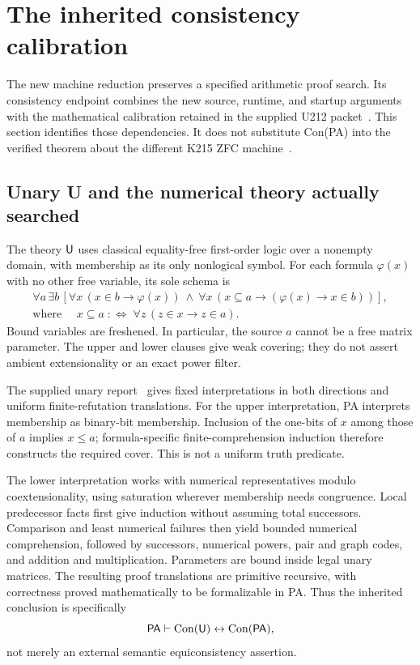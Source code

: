 \section{The inherited consistency calibration}
\label{sec:calibration}

The new machine reduction preserves a specified arithmetic proof search.
Its consistency endpoint combines the new source, runtime, and startup
arguments with the mathematical calibration retained in the supplied U212
packet~\cite{combined}. This section identifies those dependencies. It does
not substitute Con(PA) into the verified theorem about the different K215
ZFC machine~\cite{k215pa}.

\subsection{Unary U and the numerical theory actually searched}

The theory $\mathsf U$ uses classical equality-free first-order logic over a
nonempty domain, with membership as its only nonlogical symbol. For each
formula $\varphi(x)$ with no other free variable, its sole schema is
\[
 \begin{gathered}
 \forall a\,\exists b\,
 \left[
   \forall x\,(x\in b\to\varphi(x))\ \land\
   \forall x\,(x\subseteq a\to(\varphi(x)\to x\in b))
 \right],\\[4pt]
 \text{where }\quad
 x\subseteq a\;:\!\Longleftrightarrow\;
     \forall z\,(z\in x\to z\in a).
 \end{gathered}
\]
Bound variables are freshened. In particular, the source $a$ cannot be
a free matrix parameter. The upper and lower clauses give weak covering;
they do not assert ambient extensionality or an exact power filter.

The supplied unary report~\cite{unary} gives fixed interpretations in both
directions and uniform finite-refutation translations. For the upper
interpretation, PA interprets membership as binary-bit membership.
Inclusion of the one-bits of $x$ among those of $a$ implies $x\leq a$;
formula-specific finite-comprehension induction therefore constructs the
required cover. This is not a uniform truth predicate.

The lower interpretation works with numerical representatives modulo
coextensionality, using saturation wherever membership needs congruence.
Local predecessor facts first give induction without assuming total
successors. Comparison and least numerical failures then yield bounded
numerical comprehension, followed by successors, numerical powers,
pair and graph codes, and addition and multiplication. Parameters are
bound inside legal unary matrices. The resulting proof translations are
primitive recursive, with correctness proved mathematically to be
formalizable in PA. Thus the inherited conclusion is specifically
\[
                  \mathsf{PA}\vdash\operatorname{Con}(\mathsf U)\leftrightarrow\operatorname{Con}(\mathsf{PA}),
\]
not merely an external semantic equiconsistency assertion.


